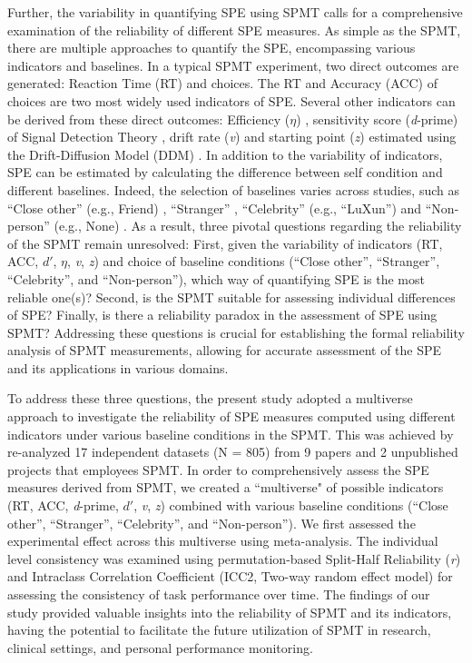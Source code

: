 \documentclass[sn-apa]{sn-jnl}%
\theoremstyle{thmstyleone}%
\theoremstyle{thmstyletwo}%
\theoremstyle{thmstylethree}%
\begin{document}
Further, the variability in quantifying SPE using SPMT calls for a comprehensive examination of the reliability of different SPE measures. As simple as the SPMT, there are multiple approaches to quantify the SPE, encompassing various indicators and baselines. In a typical SPMT experiment, two direct outcomes are generated: Reaction Time (RT) and choices. The RT and Accuracy (ACC) of choices are two most widely used indicators of SPE. Several other indicators can be derived from these direct outcomes:  Efficiency ($\eta$) \parencite{humphreys2015the,stoeber2008perfectionism}, sensitivity score (\textit{d}-prime) of Signal Detection Theory \parencite{hu2020good,sui2012perceptual}, drift rate (\textit{v}) and starting point (\textit{z}) estimated using the Drift-Diffusion Model (DDM) \parencite{golubickis2017self}.  In addition to the variability of indicators, SPE can be estimated by calculating the difference between self condition and different baselines. Indeed, the selection of baselines varies across studies, such as ``Close other” (e.g., Friend) \parencite{navon2021are, svensson2022more}, ``Stranger” \parencite{constable2021affective, orellana2020does}, “Celebrity” (e.g., ``LuXun”) \parencite{qian2020prioritised} and ``Non-person” (e.g., None) \parencite{schafer2019understanding}. As a result, three pivotal questions regarding the reliability of the SPMT remain unresolved: First, given the variability of indicators (RT, ACC, $d'$, $\eta$, \textit{v}, \textit{z}) and choice of baseline conditions (``Close other”, ``Stranger”, ``Celebrity”, and ``Non-person”), which way of quantifying SPE is the most reliable one(s)? Second, is the SPMT suitable for assessing individual differences of SPE? Finally, is there a reliability paradox in the assessment of SPE using SPMT? Addressing these questions is crucial for establishing the formal reliability analysis of SPMT measurements, allowing for accurate assessment of the SPE and its applications in various domains. 

To address these three questions, the present study adopted a multiverse approach to investigate the reliability of SPE measures computed using different indicators under various baseline conditions in the SPMT. This was achieved by re-analyzed 17 independent datasets (N = 805) from 9 papers and 2 unpublished projects that employees SPMT. In order to comprehensively assess the SPE measures derived from SPMT, we created a ``multiverse" of possible indicators (RT, ACC, \textit{d}-prime, $d'$, \textit{v}, \textit{z}) combined with various baseline conditions (``Close other”, ``Stranger”, ``Celebrity”, and ``Non-person”). We first assessed the experimental effect across this multiverse using meta-analysis. The individual level consistency was examined using permutation-based Split-Half Reliability (\textit{r}) and Intraclass Correlation Coefficient (ICC2, Two-way random effect model) for assessing the consistency of task performance over time. The findings of our study provided valuable insights into the reliability of SPMT and its indicators, having the potential to facilitate the future utilization of SPMT in research, clinical settings, and personal performance monitoring.
\end{document}
